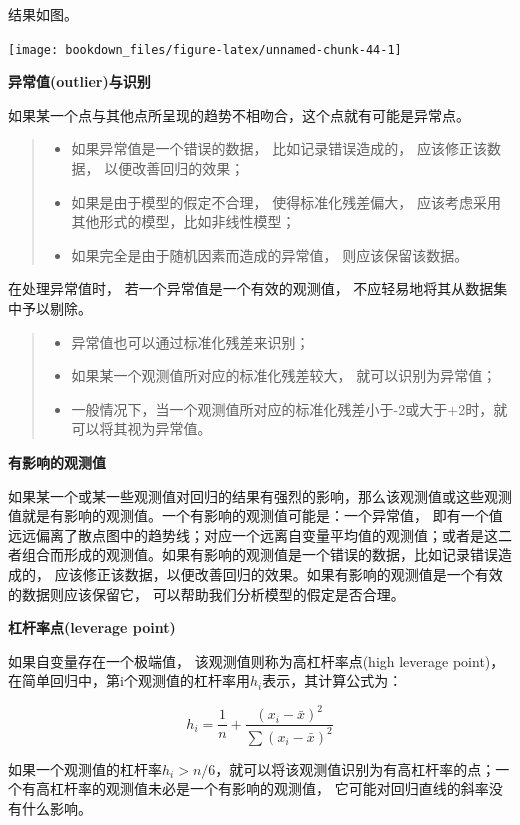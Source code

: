 \documentclass[]{ctexbook}
\providecommand{\tightlist}{%
  \setlength{\itemsep}{0pt}\setlength{\parskip}{0pt}}
\begin{document}
结果如图。

\texttt{[image: bookdown\_files/figure-latex/unnamed-chunk-44-1]}

\textbf{异常值(outlier)与识别}

如果某一个点与其他点所呈现的趋势不相吻合，这个点就有可能是异常点。

\begin{quote}
\begin{itemize}
\tightlist
\item
  如果异常值是一个错误的数据， 比如记录错误造成的， 应该修正该数据， 以便改善回归的效果；
\item
  如果是由于模型的假定不合理， 使得标准化残差偏大， 应该考虑采用其他形式的模型，比如非线性模型；
\item
  如果完全是由于随机因素而造成的异常值， 则应该保留该数据。
\end{itemize}
\end{quote}

在处理异常值时， 若一个异常值是一个有效的观测值， 不应轻易地将其从数据集中予以剔除。

\begin{quote}
\begin{itemize}
\tightlist
\item
  异常值也可以通过标准化残差来识别；
\item
  如果某一个观测值所对应的标准化残差较大， 就可以识别为异常值；
\item
  一般情况下，当一个观测值所对应的标准化残差小于-2或大于+2时，就可以将其视为异常值。
\end{itemize}
\end{quote}

\textbf{有影响的观测值}

如果某一个或某一些观测值对回归的结果有强烈的影响，那么该观测值或这些观测值就是有影响的观测值。一个有影响的观测值可能是：一个异常值， 即有一个值远远偏离了散点图中的趋势线；对应一个远离自变量平均值的观测值；或者是这二者组合而形成的观测值。如果有影响的观测值是一个错误的数据，比如记录错误造成的， 应该修正该数据，以便改善回归的效果。如果有影响的观测值是一个有效的数据则应该保留它， 可以帮助我们分析模型的假定是否合理。

\textbf{杠杆率点(leverage point)}

如果自变量存在一个极端值， 该观测值则称为高杠杆率点(high leverage point)，在简单回归中，第i个观测值的杠杆率用\(h_i\)表示，其计算公式为：

\[h_i=\frac{1}{n}+\frac{(x_i-\bar x)^2}{\sum(x_i-\bar x)^2}\]

如果一个观测值的杠杆率\(h_i>n/6\)，就可以将该观测值识别为有高杠杆率的点；一个有高杠杆率的观测值未必是一个有影响的观测值， 它可能对回归直线的斜率没有什么影响。
\end{document}
